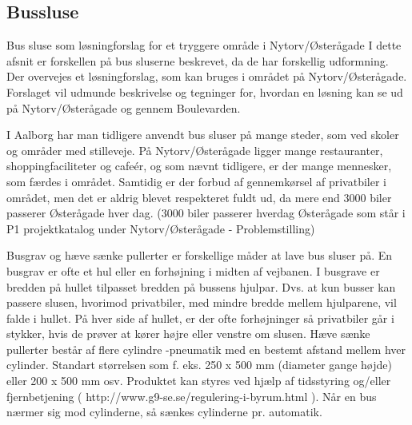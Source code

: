\subsection{Bussluse}
\label{bussluse}

Bus sluse som løsningforslag for et tryggere område i Nytorv/Østerågade
I dette afsnit er forskellen på bus sluserne beskrevet, da de har forskellig udformning. Der overvejes et løsningforslag, som kan bruges i området på Nytorv/Østerågade. Forslaget vil udmunde beskrivelse og tegninger for, hvordan en løsning kan se ud på Nytorv/Østerågade og gennem Boulevarden.

I Aalborg har man tidligere anvendt bus sluser på mange steder, som ved skoler og områder med stilleveje. På Nytorv/Østerågade ligger mange restauranter, shoppingfaciliteter og cafeér, og som nævnt tidligere, er der mange mennesker, som færdes i området. Samtidig er der forbud af gennemkørsel af privatbiler i området, men det er aldrig blevet respekteret fuldt ud, da mere end 3000 biler passerer Østerågade hver dag. (3000 biler passerer hverdag Østerågade som står i P1 projektkatalog under Nytorv/Østerågade - Problemstilling)

Busgrav og hæve sænke pullerter er forskellige måder at lave bus sluser på.
En busgrav er ofte et hul eller en forhøjning i midten af vejbanen. I busgrave er bredden på hullet tilpasset bredden på bussens hjulpar. Dvs. at kun busser kan passere slusen, hvorimod privatbiler, med mindre bredde mellem hjulparene, vil falde i hullet. På hver side af hullet, er der ofte forhøjninger så privatbiler går i stykker, hvis de prøver at kører højre eller venstre om slusen.
Hæve sænke pullerter består af flere cylindre -pneumatik med en bestemt afstand mellem hver cylinder. Standart størrelsen som f. eks. 250 x 500 mm (diameter gange højde) eller 200 x 500 mm osv. Produktet kan styres ved hjælp af tidsstyring og/eller fjernbetjening ( http://www.g9-se.se/regulering-i-byrum.html ). Når en bus nærmer sig mod cylinderne, så sænkes cylinderne pr. automatik.

